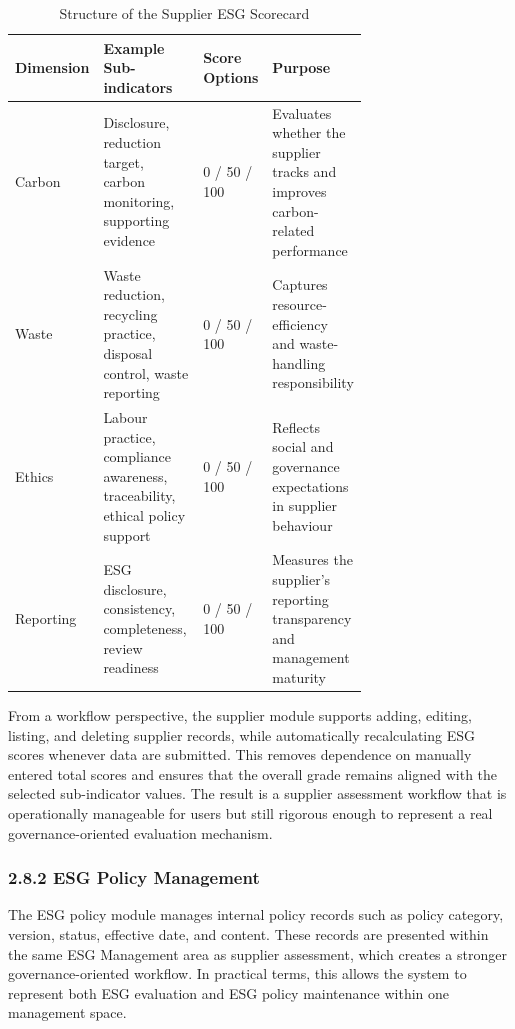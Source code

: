 \documentclass[10pt,a4paper]{article}
\begin{document}
\begin{table}[h]
\centering
\scriptsize
\begin{tabularx}{\linewidth}{@{}p{0.15\linewidth}p{0.40\linewidth}p{0.15\linewidth}X@{}}
\toprule
\textbf{Dimension} & \textbf{Example Sub-indicators} & \textbf{Score Options} & \textbf{Purpose} \\
\midrule
Carbon & Disclosure, reduction target, carbon monitoring, supporting evidence & 0 / 50 / 100 & Evaluates whether the supplier tracks and improves carbon-related performance \\
Waste & Waste reduction, recycling practice, disposal control, waste reporting & 0 / 50 / 100 & Captures resource-efficiency and waste-handling responsibility \\
Ethics & Labour practice, compliance awareness, traceability, ethical policy support & 0 / 50 / 100 & Reflects social and governance expectations in supplier behaviour \\
Reporting & ESG disclosure, consistency, completeness, review readiness & 0 / 50 / 100 & Measures the supplier's reporting transparency and management maturity \\
\bottomrule
\end{tabularx}
\caption{Structure of the Supplier ESG Scorecard}
\end{table}

From a workflow perspective, the supplier module supports adding, editing, listing, and deleting supplier records, while automatically recalculating ESG scores whenever data are submitted. This removes dependence on manually entered total scores and ensures that the overall grade remains aligned with the selected sub-indicator values. The result is a supplier assessment workflow that is operationally manageable for users but still rigorous enough to represent a real governance-oriented evaluation mechanism.

\subsubsection*{2.8.2 ESG Policy Management}
The ESG policy module manages internal policy records such as policy category, version, status, effective date, and content. These records are presented within the same ESG Management area as supplier assessment, which creates a stronger governance-oriented workflow. In practical terms, this allows the system to represent both ESG evaluation and ESG policy maintenance within one management space.
\end{document}
